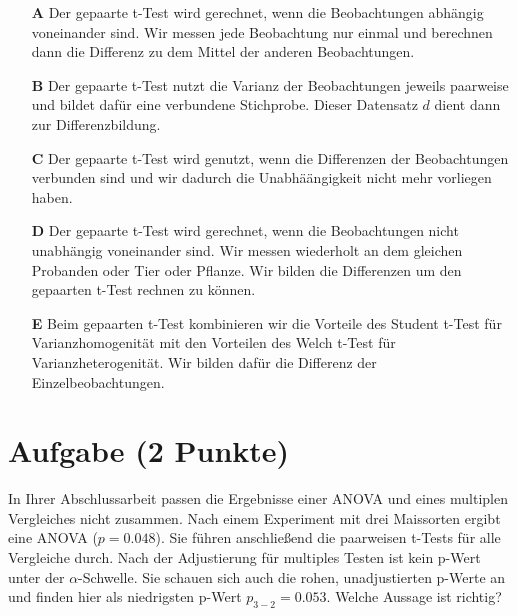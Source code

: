 \documentclass[a4paper, 9pt]{scrartcl}\usepackage[]{graphicx}\usepackage[]{xcolor}
\begin{document}
\begin{enumerate}
\item [\textbf{A} \msquare] Der gepaarte t-Test wird gerechnet, wenn die Beobachtungen abhängig voneinander sind. Wir messen jede Beobachtung nur einmal und berechnen dann die Differenz zu dem Mittel der anderen Beobachtungen.
\item [\textbf{B} \msquare] Der gepaarte t-Test nutzt die Varianz der Beobachtungen jeweils paarweise und bildet dafür eine verbundene Stichprobe. Dieser Datensatz $d$ dient dann zur Differenzbildung.
\item [\textbf{C} \msquare] Der gepaarte t-Test wird genutzt, wenn die Differenzen der Beobachtungen verbunden sind und wir dadurch die Unabhäängigkeit nicht mehr vorliegen haben.
\item [\textbf{D} \msquare] Der gepaarte t-Test wird gerechnet, wenn die Beobachtungen nicht unabhängig voneinander sind. Wir messen wiederholt an dem gleichen Probanden oder Tier oder Pflanze. Wir bilden die Differenzen um den gepaarten t-Test rechnen zu können.
\item [\textbf{E} \msquare] Beim gepaarten t-Test kombinieren wir die Vorteile des Student t-Test für Varianzhomogenität mit den Vorteilen des Welch t-Test für Varianzheterogenität. Wir bilden dafür die Differenz der Einzelbeobachtungen.
\end{enumerate}

\section{Aufgabe \hfill (2 Punkte)}



In Ihrer Abschlussarbeit passen die Ergebnisse einer ANOVA und eines multiplen Vergleiches nicht zusammen. Nach einem Experiment mit drei Maissorten ergibt eine ANOVA ($p = 0.048$). Sie führen anschließend die paarweisen t-Tests für alle Vergleiche durch. Nach der Adjustierung für multiples Testen ist kein p-Wert unter der $\alpha$-Schwelle. Sie schauen sich auch die rohen, unadjustierten p-Werte an und finden hier als niedrigsten p-Wert $p_{3-2} = 0.053$. Welche Aussage ist richtig?
\end{document}
